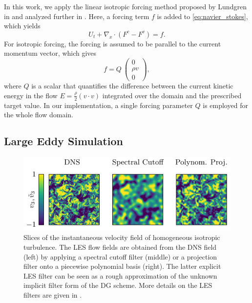 In this work, we apply the linear isotropic forcing method proposed by Lundgren in \cite{lundgren2003linearly} and analyzed further in \cite{de2015anisotropic}.
Here, a forcing term $f$ is added to \eqref{eq:navier_stokes}, which yields
\begin{equation}
  U_t + \nabla_x\cdot \left(F^c - F^v\right) = f.
  \label{eq:forced_navier_stokes}
\end{equation}
For isotropic forcing, the forcing is assumed to be parallel to the current momentum vector, which gives
\begin{equation}
  f = Q \: 
  \left(
  \begin{array}{c}
    0 \\
    \rho v\\
    0
  \end{array}
  \right),
\end{equation}
where $Q$ is a scalar that quantifies the difference between the current kinetic energy in the flow $E=\frac{\rho}{2} (v\cdot v)$ integrated over the domain and the prescribed target value.
In our implementation, a single forcing parameter $Q$ is employed for the whole flow domain.


\subsection{Large Eddy Simulation}
\label{sec:les}


\begin{figure}[tb]
  \centering
  \includegraphics[width=0.99\linewidth]{tikz_double_column/draft-figure1.pdf}
  \caption{Slices of the instantaneous velocity field of homogeneous isotropic turbulence. The LES flow fields are obtained from the DNS field (left) by applying a spectral cutoff filter (middle) or a projection filter onto a piecewise polynomial basis (right). The latter explicit LES filter can be seen as a rough approximation of the unknown implicit filter form of the DG scheme. More details on the LES filters are given in \cite{kurz2022machine}.}
  \label{fig:les_filter}
\end{figure}

